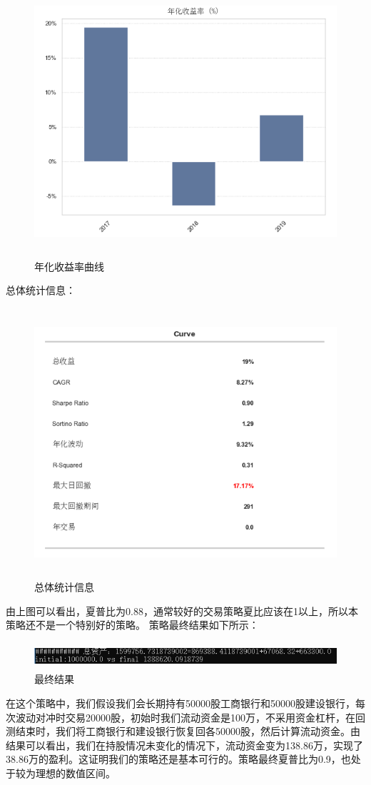 \documentclass{article}
\begin{document}
\begin{figure}[H]
	\caption{年化收益率曲线}
	\label{f000062}
	\centering
	\includegraphics[height=10cm]{images/f000062}
\end{figure}
总体统计信息：
\begin{figure}[H]
	\caption{总体统计信息}
	\label{f000063}
	\centering
	\includegraphics[height=10cm]{images/f000063}
\end{figure}
由上图可以看出，夏普比为0.88，通常较好的交易策略夏比应该在1以上，所以本策略还不是一个特别好的策略。
策略最终结果如下所示：
\begin{figure}[H]
	\caption{最终结果}
	\label{f000064}
	\centering
	\includegraphics[height=1cm]{images/f000064}
\end{figure}
在这个策略中，我们假设我们会长期持有50000股工商银行和50000股建设银行，每次波动对冲时交易20000股，初始时我们流动资金是100万，不采用资金杠杆，在回测结束时，我们将工商银行和建设银行恢复回各50000股，然后计算流动资金。由结果可以看出，我们在持股情况未变化的情况下，流动资金变为138.86万，实现了38.86万的盈利。这证明我们的策略还是基本可行的。策略最终夏普比为0.9，也处于较为理想的数值区间。
\end{document}
